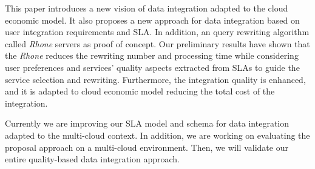 This paper introduces a new vision of data integration adapted to the cloud economic model. It also proposes a new approach for data integration based on user integration requirements and SLA. In addition, an query rewriting algorithm called \textit{Rhone} servers as proof of concept. Our preliminary results have shown that the \textit{Rhone} reduces the rewriting number and processing time while considering user preferences and services' quality aspects extracted from SLAs to guide the service selection and rewriting. Furthermore, the integration quality is enhanced, and it is adapted to cloud economic model reducing the total cost of the integration.

Currently we are improving our SLA model and schema for data integration adapted
to the multi-cloud context.  In addition, we are working on evaluating the
proposal approach on a multi-cloud environment. Then, we will validate our
entire quality-based data integration approach.
 